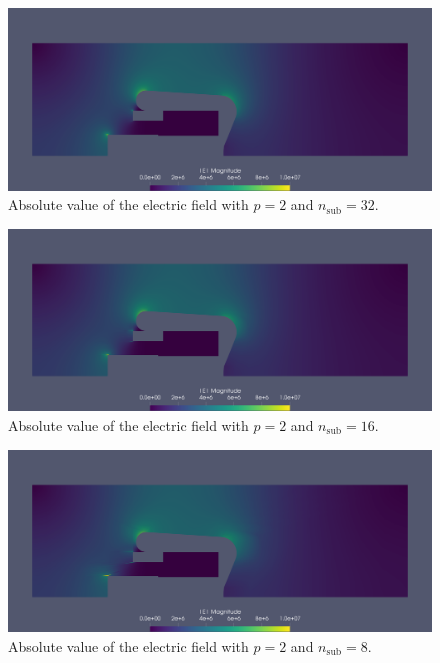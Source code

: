 \begin{center}
\begin{figure}[H]
  \includegraphics[width=\textwidth]{figures/200kV/gradient_degree=2_nsub=32}
  \caption{Absolute value of the electric field with $p=2$ and $n_\mathrm{sub}=32$.}
\end{figure}
\end{center}

\begin{center}
\begin{figure}[H]
  \includegraphics[width=\textwidth]{figures/200kV/gradient_degree=2_nsub=16}
  \caption{Absolute value of the electric field with $p=2$ and $n_\mathrm{sub}=16$.}
\end{figure}
\end{center}

\begin{center}
\begin{figure}[H]
  \includegraphics[width=\textwidth]{figures/200kV/gradient_degree=2_nsub=8}
  \caption{Absolute value of the electric field with $p=2$ and $n_\mathrm{sub}=8$.}
\end{figure}
\end{center}

